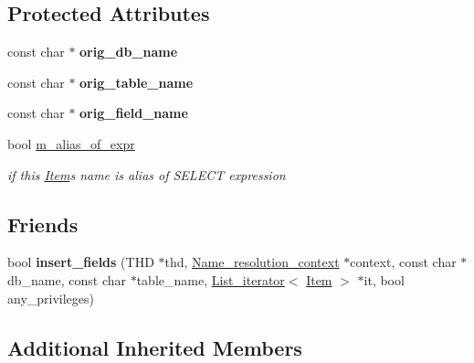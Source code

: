 \subsection*{Protected Attributes}
\begin{DoxyCompactItemize}
\item 
\mbox{\label{classItem__ident_a157964367ac5e545fca2353c01b64cef}} 
const char $\ast$ {\bfseries orig\+\_\+db\+\_\+name}
\item 
\mbox{\label{classItem__ident_a801d22e12aaeafd6e59dc2a2f1b3befd}} 
const char $\ast$ {\bfseries orig\+\_\+table\+\_\+name}
\item 
\mbox{\label{classItem__ident_aebf728237ec8974b0bdbd88d574fdb8e}} 
const char $\ast$ {\bfseries orig\+\_\+field\+\_\+name}
\item 
\mbox{\label{classItem__ident_a00ed9da939d9060884ff54b2e14437c1}} 
bool \mbox{\hyperlink{classItem__ident_a00ed9da939d9060884ff54b2e14437c1}{m\+\_\+alias\+\_\+of\+\_\+expr}}
\begin{DoxyCompactList}\small\item\em if this \mbox{\hyperlink{classItem}{Item}}\textquotesingle{}s name is alias of S\+E\+L\+E\+CT expression \end{DoxyCompactList}\end{DoxyCompactItemize}
\subsection*{Friends}
\begin{DoxyCompactItemize}
\item 
\mbox{\label{classItem__ident_a3ed6f7a411697a21f8e57aee4e40dcc9}} 
bool {\bfseries insert\+\_\+fields} (T\+HD $\ast$thd, \mbox{\hyperlink{structName__resolution__context}{Name\+\_\+resolution\+\_\+context}} $\ast$context, const char $\ast$db\+\_\+name, const char $\ast$table\+\_\+name, \mbox{\hyperlink{classList__iterator}{List\+\_\+iterator}}$<$ \mbox{\hyperlink{classItem}{Item}} $>$ $\ast$it, bool any\+\_\+privileges)
\end{DoxyCompactItemize}
\subsection*{Additional Inherited Members}


